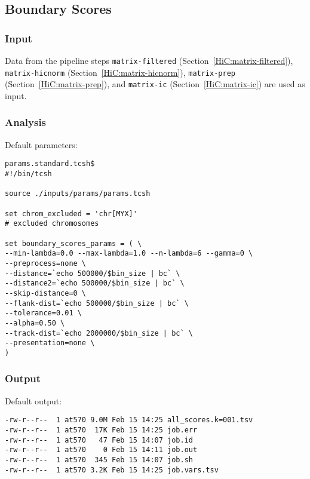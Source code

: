 \subsection{Boundary Scores}\label{HiC:boundary-scores}%
\subsubsection{Input} %
Data from the pipeline steps %
\texttt{matrix-filtered} (Section~\ref{HiC:matrix-filtered}), \texttt{matrix-hicnorm} (Section~\ref{HiC:matrix-hicnorm}), \texttt{matrix-prep} (Section~\ref{HiC:matrix-prep}), and \texttt{matrix-ic} (Section~\ref{HiC:matrix-ic}) are used as input.
\subsubsection{Analysis} %
Default parameters:
\begin{lstlisting}
params.standard.tcsh$
#!/bin/tcsh

source ./inputs/params/params.tcsh

set chrom_excluded = 'chr[MYX]'                                                      # excluded chromosomes

set boundary_scores_params = ( \
--min-lambda=0.0 --max-lambda=1.0 --n-lambda=6 --gamma=0 \
--preprocess=none \
--distance=`echo 500000/$bin_size | bc` \
--distance2=`echo 500000/$bin_size | bc` \
--skip-distance=0 \
--flank-dist=`echo 500000/$bin_size | bc` \
--tolerance=0.01 \
--alpha=0.50 \
--track-dist=`echo 2000000/$bin_size | bc` \
--presentation=none \
)
\end{lstlisting}
\subsubsection{Output} %
Default output: %
\begin{lstlisting}
-rw-r--r--  1 at570 9.0M Feb 15 14:25 all_scores.k=001.tsv
-rw-r--r--  1 at570  17K Feb 15 14:25 job.err
-rw-r--r--  1 at570   47 Feb 15 14:07 job.id
-rw-r--r--  1 at570    0 Feb 15 14:11 job.out
-rw-r--r--  1 at570  345 Feb 15 14:07 job.sh
-rw-r--r--  1 at570 3.2K Feb 15 14:25 job.vars.tsv
\end{lstlisting}
\clearpage